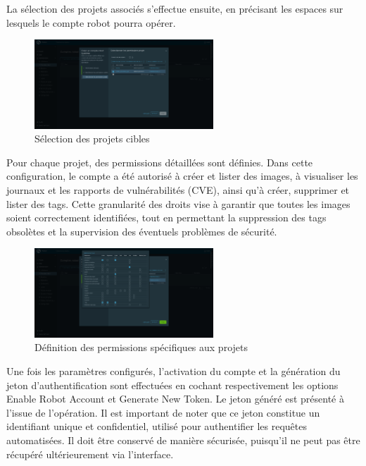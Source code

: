 La sélection des projets associés s’effectue ensuite, en précisant les espaces sur lesquels le compte robot pourra opérer.

\begin{figure}[H]
	\centering
	\includegraphics[width=0.6\textwidth]{figures/harbor robot account projects.png}
	\caption{Sélection des projets cibles}
\end{figure}

Pour chaque projet, des permissions détaillées sont définies. Dans cette configuration, le compte a été autorisé à créer et lister des images, à visualiser les journaux et les rapports de vulnérabilités (CVE), ainsi qu’à créer, supprimer et lister des tags. Cette granularité des droits vise à garantir que toutes les images soient correctement identifiées, tout en permettant la suppression des tags obsolètes et la supervision des éventuels problèmes de sécurité.

\begin{figure}[H]
	\centering
	\includegraphics[width=0.6\textwidth]{figures/harbor robot account projects permissions.png}
	\caption{Définition des permissions spécifiques aux projets}
\end{figure}

Une fois les paramètres configurés, l’activation du compte et la génération du jeton d’authentification sont effectuées en cochant respectivement les options Enable Robot Account et Generate New Token. Le jeton généré est présenté à l’issue de l’opération. Il est important de noter que ce jeton constitue un identifiant unique et confidentiel, utilisé pour authentifier les requêtes automatisées. Il doit être conservé de manière sécurisée, puisqu’il ne peut pas être récupéré ultérieurement via l’interface.

